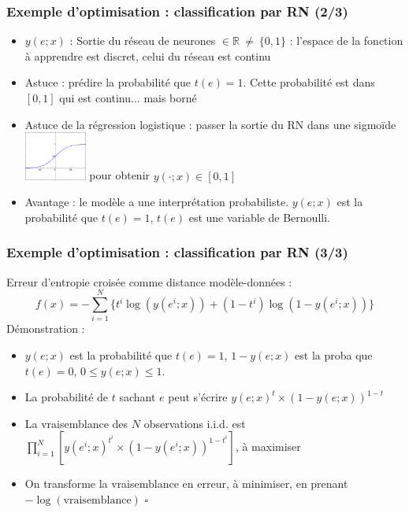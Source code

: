 \documentclass[12pt]{beamer}
\begin{document}
\begin{frame}
\frametitle{Exemple d'optimisation : classification par RN (2/3)}
\begin{itemize}
\item $y(e;x)$ : Sortie du réseau de neurones $\in \mathbb R ~\ne~ \{0,1\}$ : l'espace de la fonction à apprendre est discret, celui du réseau est continu 
\item Astuce : prédire la probabilité que $t(e)=1$. Cette probabilité est dans $[0,1]$ qui est continu... mais borné 
\item Astuce de la régression logistique : passer la sortie du RN dans une sigmoïde 
\includegraphics[width=0.16\textwidth]{SigmoidFunction.png}
pour obtenir $y(\cdot ; x) \in [0,1]$ 
\item Avantage : le modèle a une interprétation probabiliste. $y(e;x)$ est la probabilité que $t(e)=1$, $t(e)$ est une variable de Bernoulli.
\end{itemize}
\end{frame}

\begin{frame}
\frametitle{Exemple d'optimisation : classification par RN (3/3)}
\alert{Erreur d'entropie croisée} comme distance modèle-données : 
\begin{equation*}
f(x) = - \sum_{i=1}^N \{ t^i \log(y(e^i;x)) + (1-t^i) \log(1 - y(e^i;x))\}
\end{equation*}
Démonstration :\\
\begin{itemize}
\item $y(e;x)$ est la probabilité que $t(e)=1$, $1-y(e;x)$ est la proba que $t(e)=0$, $0 \le y(e;x) \le 1$.
\item La probabilité de $t$ sachant $e$ peut s'écrire $y(e;x)^t \times (1 - y(e;x))^{1-t}$
\item La vraisemblance des $N$ observations i.i.d. est $\prod_{i=1}^N \left[y(e^i;x)^{t^i} \times (1-y(e^i;x))^{1-t^i}\right]$, à maximiser
\item On transforme la vraisemblance en erreur, à minimiser, en prenant $-\log(\text{vraisemblance})$ \qquad $\square$
\end{itemize}
\end{frame}
\end{document}
